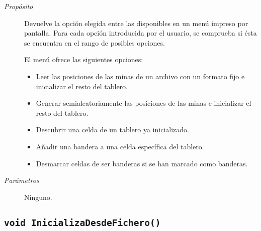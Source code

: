 \documentclass[12pt]{article}
\begin{document}
\begin{description}

\item[\emph{Propósito}]

Devuelve la opción elegida entre las disponibles en un menú impreso por
pantalla. Para cada opción introducida por el usuario, se comprueba si ésta se
encuentra en el rango de posibles opciones.

El menú ofrece las siguientes opciones:

\begin{itemize}

\item Leer las posiciones de las minas de un archivo con un formato fijo e
inicializar el resto del tablero.
\item Generar semialeatoriamente las posiciones de las minas e inicializar el
resto del tablero.
\item Descubrir una celda de un tablero ya inicializado.
\item Añadir una bandera a una celda específica del tablero.
\item Desmarcar celdas de ser banderas si se han marcado como banderas.

\end{itemize}

\item[\emph{Parámetros}]

Ninguno.

\end{description}

\subsection*{\texttt{void InicializaDesdeFichero()}}
\end{document}
